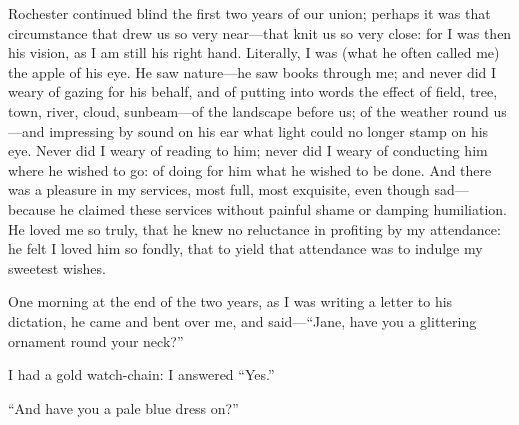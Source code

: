 \Mr{} Rochester continued blind the first two years of our union; perhaps
it was that circumstance that drew us so very near---that knit us so
very close: for I was then his vision, as I am still his right hand.
Literally, I was (what he often called me) the apple of his eye. He saw
nature---he saw books through me; and never did I weary of gazing for
his behalf, and of putting into words the effect of field, tree, town,
river, cloud, sunbeam---of the landscape before us; of the weather round
us---and impressing by sound on his ear what light could no longer stamp
on his eye. Never did I weary of reading to him; never did I weary of
conducting him where he wished to go: of doing for him what he wished to
be done. And there was a pleasure in my services, most full, most
exquisite, even though sad---because he claimed these services without
painful shame or damping humiliation. He loved me so truly, that he
knew no reluctance in profiting by my attendance: he felt I loved him so
fondly, that to yield that attendance was to indulge my sweetest wishes.

One morning at the end of the two years, as I was writing a letter to
his dictation, he came and bent over me, and said---\enquote{Jane, have
	you a glittering ornament round your neck?}

I had a gold watch-chain: I answered \enquote{Yes.}

\enquote{And have you a pale blue dress on?}

